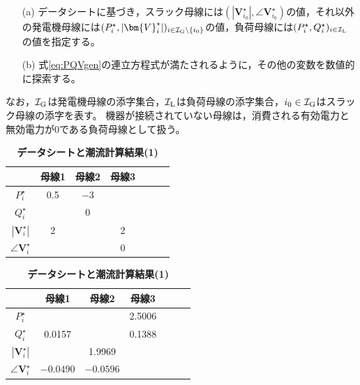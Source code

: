 \documentclass[tombow,dvipdfmx]{corona-a5-1.1}
\begin{document}
\medskip
\begin{breakbox}
\begin{itemize}
\item[(a)] データシートに基づき，スラック母線には$(|\bm{V}_{i_0}^{\star}|,\angle \bm{V}_{i_0}^{\star})$の値，それ以外の発電機母線には$(P_i^{\star},|\bm{V}_{i}^{\star}|)_{i \in \mathcal{I}_{\rm G}\setminus\{i_0\} }$の値，負荷母線には$(P_i^{\star},Q_i^{\star})_{i \in \mathcal{I}_{\rm L}}$の値を指定する。
\item[(b)] 式\ref{eq:PQVgen}の連立方程式が満たされるように，その他の変数を数値的に探索する。
\end{itemize}
\end{breakbox}
\medskip

なお，$\mathcal{I}_{\rm G}$は発電機母線の添字集合，$\mathcal{I}_{\rm L}$は負荷母線の添字集合，$i_0 \in \mathcal{I}_{\rm G}$はスラック母線の添字を表す。
機器が接続されていない母線は，消費される有効電力と無効電力が0である負荷母線として扱う。

%


\begin{table}[h]
\medskip
\caption{\textbf{データシートと潮流計算結果(1)}} \label{table:pflow1}
 \centering
  {
  \begin{minipage}{0.49\linewidth}
    \centering
  \begin{tabular}{|c|c|c|c|c|c|c|}
   \hline
 &  母線1 & 母線2 & 母線3 \\
   \hline 
   $P_i^{\star}$ & 0.5 & $-3$ & \\
   \hline
   $Q_i^{\star}$ &  & 0 & \\
   \hline
   $|\bm{V}_i^{\star}|$ & 2 & & 2 \\
   \hline
   $\angle \bm{V}_i^{\star}$ & & & 0 \\
   \hline
  \end{tabular}
  \end{minipage}
  \begin{minipage}{0.49\linewidth}
    \centering
  \begin{tabular}{|c|c|c|c|c|c|c|}
   \hline
 &  母線1 & 母線2 & 母線3 \\
   \hline 
   $P_i^{\star}$ & & & 2.5006 \\
   \hline
   $Q_i^{\star}$ & 0.0157 & & 0.1388 \\
   \hline
   $|\bm{V}_i^{\star}|$ & & 1.9969 & \\
   \hline
   $\angle \bm{V}_i^{\star}$ & $-0.0490$ & $-0.0596$ & \\
   \hline
  \end{tabular}
  \end{minipage}
  }
\end{table}
\end{document}
